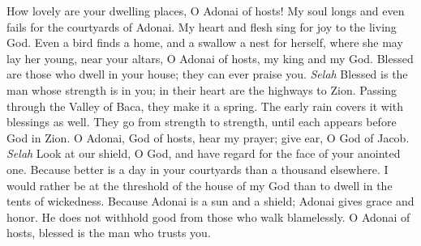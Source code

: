 \begin{biblechapter} %
 How lovely are your dwelling places, 
O Adonai of hosts!
\verse My soul longs and even fails 
for the courtyards of Adonai. 
My heart and flesh sing for joy 
to the living God.
\verse Even a bird finds a home, and a swallow a nest for herself, 
where she may lay her young, 
near your altars, O Adonai of hosts, 
my king and my God.
\verse Blessed are those who dwell in your house; 
they can ever praise you. \textit{Selah}
\verse Blessed is the man whose strength is in you; 
in their heart are the highways to Zion.
\verse Passing through the Valley of Baca, 
they make it a spring. 
The early rain covers it with blessings as well.
\verse They go from strength to strength, 
until each appears before God in Zion.
\verse O Adonai, God of hosts, hear my prayer; 
give ear, O God of Jacob. \textit{Selah}
\verse Look at our shield, O God, 
and have regard for the face of your anointed one.
\verse Because better is a day in your courtyards 
than a thousand elsewhere. 
I would rather be at the threshold of the house of my God 
than to dwell in the tents of wickedness.
\verse Because Adonai is a sun and a shield; 
Adonai gives grace and honor. 
He does not withhold good from those who walk blamelessly.
\verse O Adonai of hosts, 
blessed is the man who trusts you.
\end{biblechapter}

